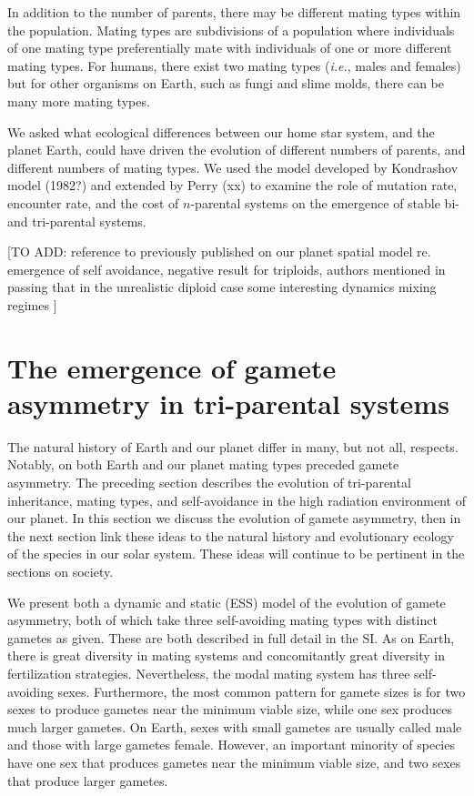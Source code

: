 \documentclass{report}
\begin{document}
In addition to the number of parents, there may be different mating types within the population. Mating types are subdivisions of a population where individuals of one mating type preferentially mate with individuals of one or more different mating types. For humans, there exist two mating types (\emph{i.e.}, males and females) but for other organisms on Earth, such as fungi and slime molds, there can be many more mating types. 

We asked what ecological differences between our home star system, and the planet Earth, could have driven the evolution of different numbers of parents, and different numbers of mating types. We used the model developed by Kondrashov model (1982?) and extended by Perry (xx) to examine the role of mutation rate, encounter rate, and the cost of $n$-parental systems on the emergence of stable bi- and tri-parental systems.

[TO ADD: reference to previously published on our planet spatial model re. emergence of self avoidance, negative result for triploids, authors mentioned in passing that in the unrealistic diploid case some interesting dynamics mixing regimes ]

\section*{The emergence of gamete asymmetry in tri-parental systems}

The natural history of Earth and our planet differ in many, but not all, respects. Notably, on both Earth and our planet mating types preceded gamete asymmetry. The preceding section describes the evolution of tri-parental inheritance, mating types, and self-avoidance in the high radiation environment of our planet. In this section we discuss the evolution of gamete asymmetry, then in the next section link these ideas to the natural history and evolutionary ecology of the species in our solar system. These ideas will continue to be pertinent in the sections on society.

We present both a dynamic and static (ESS) model of the evolution of gamete asymmetry, both of which take three self-avoiding mating types with distinct gametes as given. These are both described in full detail in the SI. As on Earth, there is great diversity in mating systems and concomitantly great diversity in fertilization strategies. Nevertheless, the modal mating system has three self-avoiding sexes. Furthermore, the most common pattern for gamete sizes is for two sexes to produce gametes near the minimum viable size, while one sex produces much larger gametes. On Earth, sexes with small gametes are usually called male and those with large gametes female. However, an important minority of species have one sex that produces gametes near the minimum viable size, and two sexes that produce larger gametes.
\end{document}
